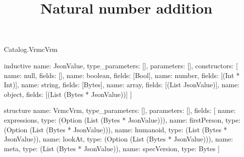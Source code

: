 \begin{lexlean}{Catalog.VrmcVrm}
\title{Natural number addition}
\begin{semanticmodule}
inductive{
  name: JsonValue,
  type_parameters: [],
  parameters: [],
  constructors: [
    {name: null, fields: []},
    {name: boolean, fields: [Bool]},
    {name: number, fields: [(Int * Int)]},
    {name: string, fields: [Bytes]},
    {name: array, fields: [(List JsonValue)]},
    {name: object, fields: [(List (Bytes * JsonValue))]}
  ]
}

structure{
  name: VrmcVrm,
  type_parameters: [],
  parameters: [],
  fields: [
    {name: expressions, type: (Option (List (Bytes * JsonValue)))},
    {name: firstPerson, type: (Option (List (Bytes * JsonValue)))},
    {name: humanoid, type: (List (Bytes * JsonValue))},
    {name: lookAt, type: (Option (List (Bytes * JsonValue)))},
    {name: meta, type: (List (Bytes * JsonValue))},
    {name: specVersion, type: Bytes}
  ]
}
\end{semanticmodule}
\end{lexlean}
